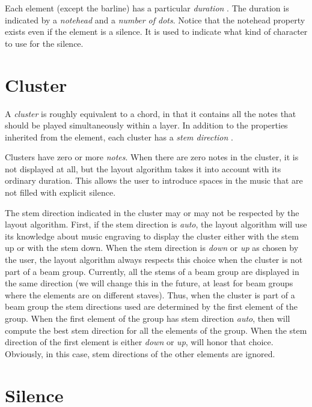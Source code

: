 Each element (except the barline) has a particular \emph{duration}
.  The duration is indicated by a \emph{notehead}
 and a \emph{number of dots}. 
 Notice that the notehead property exists even
if the element is a silence.  It is used to indicate what kind of
character to use for the silence.


\section{Cluster}

A \emph{cluster} is roughly equivalent to a chord, in
that it contains all the notes that should be played simultaneously
within a layer.  In addition to the properties inherited from the
element, each cluster has a \emph{stem direction}  .

Clusters have zero or more \emph{notes}.  When there are zero notes in
the cluster, it is not displayed at all, but the layout algorithm
takes it into account with its ordinary duration.  This allows the
user to introduce spaces in the music that are not filled with
explicit silence. 

The stem direction indicated in the cluster may or may not be
respected by the layout algorithm.  First, if the stem direction is
\emph{auto}, the layout algorithm will use its knowledge about music
engraving to display the cluster either with the stem up or with the
stem down.  When the stem direction is \emph{down} or \emph{up} as
chosen by the user, the layout algorithm always respects this choice
when the cluster is not part of a beam group.  Currently, all the
stems of a beam group are displayed in the same direction (we will
change this in the future, at least for beam groups where the elements
are on different staves).  Thus, when the cluster is part of a beam
group the stem directions used are determined by the first element of
the group.  When the first element of the group has stem direction
\emph{auto}, then \sysname{} will compute the best stem direction for all
the elements of the group.  When the stem direction of the first
element is either \emph{down} or \emph{up}, \sysname{} will honor that
choice.  Obviously, in this case, stem directions of the other
elements are ignored. 

\section{Silence}

